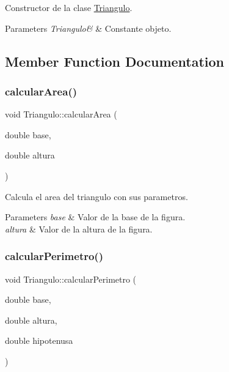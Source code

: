 Constructor de la clase \hyperlink{class_triangulo}{Triangulo}. 


\begin{DoxyParams}{Parameters}
{\em Triangulo\&} & Constante objeto. \\
\hline
\end{DoxyParams}


\subsection{Member Function Documentation}
\hypertarget{class_triangulo_a11f6635bf56a065274b6777f897909e8}{}\label{class_triangulo_a11f6635bf56a065274b6777f897909e8} 
\subsubsection{\texorpdfstring{calcular\+Area()}{calcularArea()}}
{\ttfamily void Triangulo\+::calcular\+Area (\begin{DoxyParamCaption}\item[{double}]{base,  }\item[{double}]{altura }\end{DoxyParamCaption})\hspace{0.3cm}{\ttfamily [virtual]}}



Calcula el area del triangulo con sus parametros. 


\begin{DoxyParams}{Parameters}
{\em base} & Valor de la base de la figura. \\
\hline
{\em altura} & Valor de la altura de la figura. \\
\hline
\end{DoxyParams}
\hypertarget{class_triangulo_a76867bdb3344be0d36d76027b810b64f}{}\label{class_triangulo_a76867bdb3344be0d36d76027b810b64f} 
\subsubsection{\texorpdfstring{calcular\+Perimetro()}{calcularPerimetro()}}
{\ttfamily void Triangulo\+::calcular\+Perimetro (\begin{DoxyParamCaption}\item[{double}]{base,  }\item[{double}]{altura,  }\item[{double}]{hipotenusa }\end{DoxyParamCaption})}




